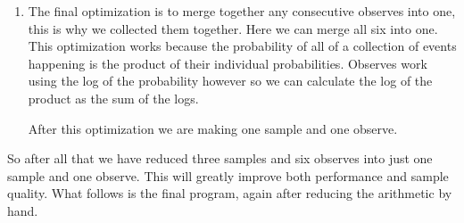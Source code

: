 \documentclass[a4paper]{article}
\begin{document}
\begin{enumerate}
\begin{center}
\begin{varwidth}{\linewidth}
\begin{verbatim}
				int main(int argc, char **argv) {
				    double gradient = uniform_rng(0.0, 1.0);

				    observe(normal_lnp(20.0,
				                       gradient * 88.6,
				                       392.798));
				    observe(normal_lnp(16.0,
				                       gradient * 0.009572350164697 + 16.1603674152755,
				                       0.172665339437));
				    observe(normal_lnp(19.8,
				                       gradient * 0.0215414920690030 + 20.9779100181940,
				                       0.171472119913));
				    observe(normal_lnp(18.4,
				                       gradient * 0.00714550738045528 + 18.5274790332219,
				                       0.132812797595));
				    observe(normal_lnp(17.1,
				                       gradient * 0.0032241962331263 + 17.6916967883102,
				                       0.123114249847));
				    observe(normal_lnp(15.5,
				                       gradient * -0.0005048414824 + 16.4109671553285,
				                       0.118203847628));
				    
				    predict("%s,%f\n", "gradient", gradient);
				    return 0;
				}
			\end{verbatim}
		\end{varwidth}
	\end{center}

\item
	The final optimization is to merge together any consecutive observes into one, this is why we collected them together. Here we can merge all six into one. This optimization works because the probability of all of a collection of events happening is the product of their individual probabilities. Observes work using the log of the probability however so we can calculate the log of the product as the sum of the logs.

	After this optimization we are making one sample and one observe.

\end{enumerate}

So after all that we have reduced three samples and six observes into just one sample and one observe. This will greatly improve both performance and sample quality. What follows is the final program, again after reducing the arithmetic by hand.
\end{document}
